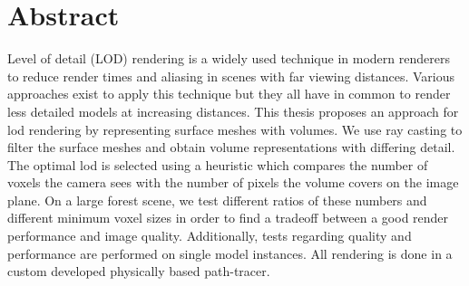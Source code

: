 \chapter*{Abstract}
Level of detail (LOD) rendering is a widely used technique in modern renderers to reduce render times and aliasing in scenes with far viewing distances.
Various approaches exist to apply this technique but they all have in common to render less detailed models at increasing distances.
This thesis proposes an approach for \acs{lod} rendering by representing surface meshes with volumes.
We use ray casting to filter the surface meshes and obtain volume representations with differing detail.
The optimal \ac{lod} is selected using a heuristic which compares the number of voxels the camera sees with the number of pixels the volume covers on the image plane.
On a large forest scene, we test different ratios of these numbers and different minimum voxel sizes in order to find a tradeoff between a good render performance and image quality.
Additionally, tests regarding quality and performance are performed on single model instances.
All rendering is done in a custom developed physically based path-tracer.